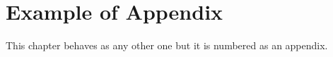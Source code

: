 \chapter{Example of Appendix}\label{ch:App_Example}
This chapter behaves as any other one but it is numbered as an appendix.